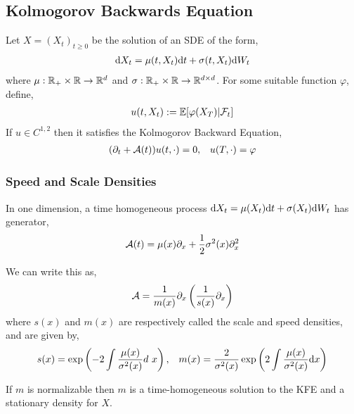 \documentclass[12pt]{article}
\begin{document}
\subsection{Kolmogorov Backwards Equation}
Let \( X = (X_t)_{t\geq 0} \) be the solution of an SDE of the form,
\begin{align*}
    \mathrm{d} X_t = \mu(t,X_t)\mathrm{d} t + \sigma(t,X_t)\mathrm{d} W_t
\end{align*}
where \( \mu:\mathbb{R}_+\times\mathbb{R} \to\mathbb{R}^d  \) and \( \sigma:\mathbb{R}_+\times\mathbb{R} \to \mathbb{R}^{d\times d} \).
For some suitable function \( \varphi \), define,
\begin{align*}
    u(t,X_t):= \mathbb{E}[\varphi(X_T)|\mathcal{F}_t]
\end{align*}
If \( u\in C^{1,2} \) then it satisfies the Kolmogorov Backward Equation,
\begin{align*}
    (\partial_t + \cA(t)) u(t,\cdot) = 0, && u(T,\cdot) = \varphi %
\end{align*}

\subsubsection{Speed and Scale Densities}
In one dimension, a time homogeneous process \( \mathrm{d} X_t = \mu(X_t) \mathrm{d} t + \sigma(X_t) \mathrm{d} W_t \) has generator,
\begin{align*}
    \mathcal{A}(t) = \mu(x) \partial_x + \frac{1}{2}\sigma^2(x)\partial_x^2
\end{align*}

We can write this as,
\begin{align*}
    \mathcal{A} = \frac{1}{m(x)}\partial_x \left( \frac{1}{s(x)}\partial_x \right)
\end{align*}
where \( s(x) \) and \( m(x) \) are respectively called the scale and speed densities, and are given by,
\begin{align*}
    s(x) = \exp \left( - 2\int \frac{\mu(x)}{\sigma^2(x)}d\ x \right)
    ,&& m(x) = \frac{2}{\sigma^2(x)} \exp \left( 2\int \frac{\mu(x)}{\sigma^2(x)}\mathrm{d} x \right)
\end{align*}

If \( m \) is normalizable then \( m \) is a time-homogeneous solution to the KFE and a stationary density for \( X \).
\end{document}
